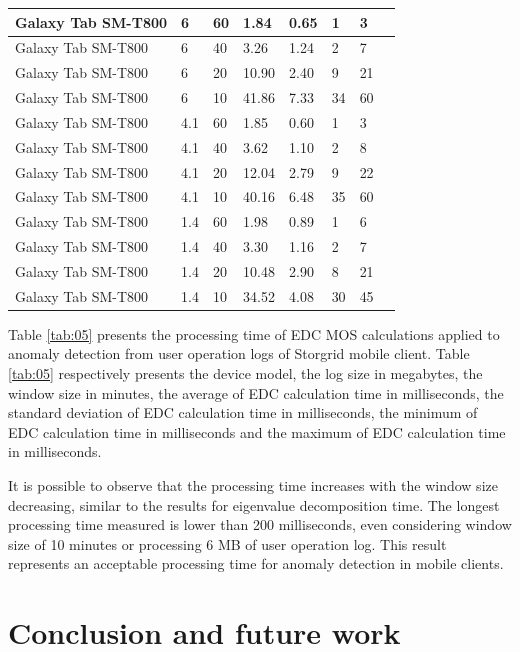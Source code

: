\documentclass[twocolumn]{svjour3}          	%
\begin{document}
\begin{table}[!t]
\begin{tabular}{|l|l|l|l|l|l|l|l|}
		Galaxy Tab SM-T800	& 6	& 60	& 1.84	& 0.65	& 1	& 3	\\ \hline
		Galaxy Tab SM-T800	& 6	& 40	& 3.26	& 1.24	& 2	& 7	\\ \hline
		Galaxy Tab SM-T800	& 6	& 20	& 10.90	& 2.40	& 9	& 21	\\ \hline
		Galaxy Tab SM-T800	& 6	& 10	& 41.86	& 7.33	& 34	& 60	\\ \hline
		Galaxy Tab SM-T800	& 4.1	& 60	& 1.85	& 0.60	& 1	& 3	\\ \hline
		Galaxy Tab SM-T800	& 4.1	& 40	& 3.62	& 1.10	& 2	& 8	\\ \hline
		Galaxy Tab SM-T800	& 4.1	& 20	& 12.04	& 2.79	& 9	& 22	\\ \hline
		Galaxy Tab SM-T800	& 4.1	& 10	& 40.16	& 6.48	& 35	& 60	\\ \hline
		Galaxy Tab SM-T800	& 1.4	& 60	& 1.98	& 0.89	& 1	& 6	\\ \hline
		Galaxy Tab SM-T800	& 1.4	& 40	& 3.30	& 1.16	& 2	& 7	\\ \hline
		Galaxy Tab SM-T800	& 1.4	& 20	& 10.48	& 2.90	& 8	& 21	\\ \hline
		Galaxy Tab SM-T800	& 1.4	& 10	& 34.52	& 4.08	& 30	& 45	\\ \hline
	\end{tabular}
\end{table}

Table \ref{tab:05} presents the processing time of EDC MOS calculations applied to anomaly detection from user operation logs of Storgrid mobile client. Table \ref{tab:05} respectively presents the device model, the log size in megabytes, the window size in minutes, the average of EDC calculation time in milliseconds, the standard deviation of EDC calculation time in milliseconds, the minimum of EDC calculation time in milliseconds and the maximum of EDC calculation time in milliseconds.

It is possible to observe that the processing time increases with the window size decreasing, similar to the results for eigenvalue decomposition time. The longest processing time measured is lower than 200 milliseconds, even considering window size of 10 minutes or processing 6 MB of user operation log. This result represents an acceptable processing time for anomaly detection in mobile clients.

\section{Conclusion and future work}
\label{sec_conclusion}
\end{document}
